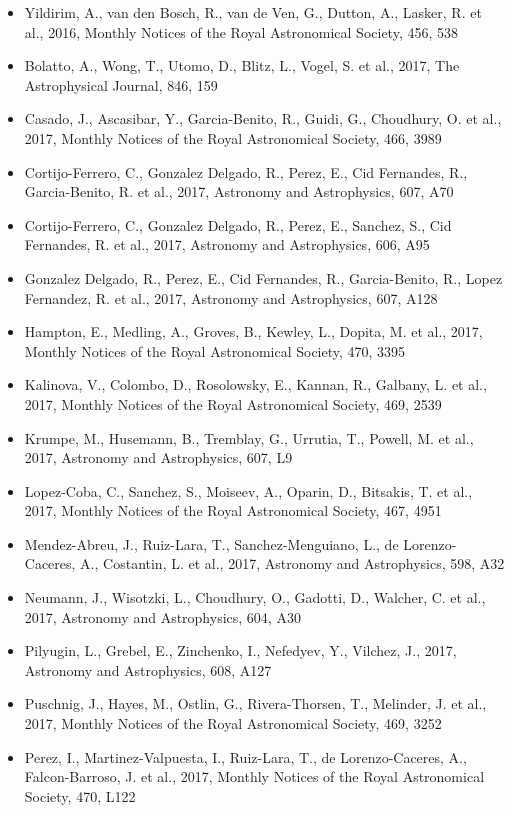 \documentclass{letter}
\begin{document}
\begin{enumerate}
\begin{itemize}
\item Yildirim, A., van den Bosch, R., van de Ven, G., Dutton, A., Lasker, R. et al., 2016, Monthly Notices of the Royal Astronomical Society, 456, 538
\item Bolatto, A., Wong, T., Utomo, D., Blitz, L., Vogel, S. et al., 2017, The Astrophysical Journal, 846, 159
\item Casado, J., Ascasibar, Y., Garcia-Benito, R., Guidi, G., Choudhury, O. et al., 2017, Monthly Notices of the Royal Astronomical Society, 466, 3989
\item Cortijo-Ferrero, C., Gonzalez Delgado, R., Perez, E., Cid Fernandes, R., Garcia-Benito, R. et al., 2017, Astronomy and Astrophysics, 607, A70
\item Cortijo-Ferrero, C., Gonzalez Delgado, R., Perez, E., Sanchez, S., Cid Fernandes, R. et al., 2017, Astronomy and Astrophysics, 606, A95
\item Gonzalez Delgado, R., Perez, E., Cid Fernandes, R., Garcia-Benito, R., Lopez Fernandez, R. et al., 2017, Astronomy and Astrophysics, 607, A128
\item Hampton, E., Medling, A., Groves, B., Kewley, L., Dopita, M. et al., 2017, Monthly Notices of the Royal Astronomical Society, 470, 3395
\item Kalinova, V., Colombo, D., Rosolowsky, E., Kannan, R., Galbany, L. et al., 2017, Monthly Notices of the Royal Astronomical Society, 469, 2539
\item Krumpe, M., Husemann, B., Tremblay, G., Urrutia, T., Powell, M. et al., 2017, Astronomy and Astrophysics, 607, L9
\item Lopez-Coba, C., Sanchez, S., Moiseev, A., Oparin, D., Bitsakis, T. et al., 2017, Monthly Notices of the Royal Astronomical Society, 467, 4951
\item Mendez-Abreu, J., Ruiz-Lara, T., Sanchez-Menguiano, L., de Lorenzo-Caceres, A., Costantin, L. et al., 2017, Astronomy and Astrophysics, 598, A32
\item Neumann, J., Wisotzki, L., Choudhury, O., Gadotti, D., Walcher, C. et al., 2017, Astronomy and Astrophysics, 604, A30
\item Pilyugin, L., Grebel, E., Zinchenko, I., Nefedyev, Y., Vilchez, J., 2017, Astronomy and Astrophysics, 608, A127
\item Puschnig, J., Hayes, M., Ostlin, G., Rivera-Thorsen, T., Melinder, J. et al., 2017, Monthly Notices of the Royal Astronomical Society, 469, 3252
\item Perez, I., Martinez-Valpuesta, I., Ruiz-Lara, T., de Lorenzo-Caceres, A., Falcon-Barroso, J. et al., 2017, Monthly Notices of the Royal Astronomical Society, 470, L122

\end{itemize}
\end{enumerate}
\end{document}
